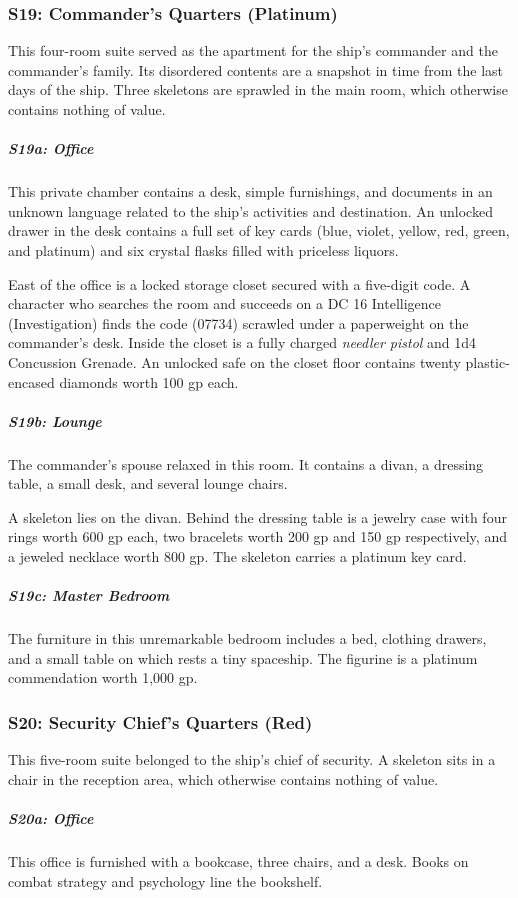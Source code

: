 \documentclass[10pt,a4paper,twoside,bg=print,twocolumn,openany,nodeprecatedcode]{dndbook}
\begin{document}
\subsubsection{S19: Commander's Quarters (Platinum)}
This four-room suite served as the apartment for the ship's commander and the commander's family. Its disordered contents are a snapshot in time from the last days of the ship. Three skeletons are sprawled in the main room, which otherwise contains nothing of value.

\subparagraph{S19a: Office}
This private chamber contains a desk, simple furnishings, and documents in an unknown language related to the ship's activities and destination. An unlocked drawer in the desk contains a full set of key cards (blue, violet, yellow, red, green, and platinum) and six crystal flasks filled with priceless liquors.

East of the office is a locked storage closet secured with a five-digit code. A character who searches the room and succeeds on a DC 16 Intelligence (Investigation) finds the code (07734) scrawled under a paperweight on the commander's desk. Inside the closet is a fully charged \textit{needler pistol} and 1d4 Concussion Grenade. An unlocked safe on the closet floor contains twenty plastic-encased diamonds worth 100 gp each.

\subparagraph{S19b: Lounge}
The commander's spouse relaxed in this room. It contains a divan, a dressing table, a small desk, and several lounge chairs.

A skeleton lies on the divan. Behind the dressing table is a jewelry case with four rings worth 600 gp each, two bracelets worth 200 gp and 150 gp respectively, and a jeweled necklace worth 800 gp. The skeleton carries a platinum key card.

\subparagraph{S19c: Master Bedroom}
The furniture in this unremarkable bedroom includes a bed, clothing drawers, and a small table on which rests a tiny spaceship. The figurine is a platinum commendation worth 1,000 gp.

\subsubsection{S20: Security Chief's Quarters (Red)}
This five-room suite belonged to the ship's chief of security. A skeleton sits in a chair in the reception area, which otherwise contains nothing of value.

\subparagraph{S20a: Office}
This office is furnished with a bookcase, three chairs, and a desk. Books on combat strategy and psychology line the bookshelf.
\end{document}
